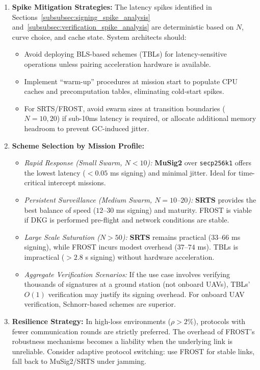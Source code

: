 \begin{enumerate}
    \item \textbf{Spike Mitigation Strategies:} The latency spikes identified in Sections~\ref{subsubsec:signing_spike_analysis} and~\ref{subsubsec:verification_spike_analysis} are deterministic based on $N$, curve choice, and cache state. System architects should:
    \begin{itemize}
        \item Avoid deploying BLS-based schemes (TBLs) for latency-sensitive operations unless pairing acceleration hardware is available.
        \item Implement ``warm-up'' procedures at mission start to populate CPU caches and precomputation tables, eliminating cold-start spikes.
        \item For SRTS/FROST, avoid swarm sizes at transition boundaries ($N=10, 20$) if sub-10ms latency is required, or allocate additional memory headroom to prevent GC-induced jitter.
    \end{itemize}
    
    \item \textbf{Scheme Selection by Mission Profile:}
    \begin{itemize}
        \item \textit{Rapid Response (Small Swarm, $N < 10$):} \textbf{MuSig2} over \texttt{secp256k1} offers the lowest latency ($< 0.05$ ms signing) and minimal jitter. Ideal for time-critical intercept missions.
        \item \textit{Persistent Surveillance (Medium Swarm, $N = 10$--$20$):} \textbf{SRTS} provides the best balance of speed ($12$--$30$ ms signing) and maturity. FROST is viable if DKG is performed pre-flight and network conditions are stable.
        \item \textit{Large Scale Saturation ($N > 50$):} \textbf{SRTS} remains practical ($33$--$66$ ms signing), while FROST incurs modest overhead ($37$--$74$ ms). TBLs is impractical ($> 2.8$ s signing) without hardware acceleration.
        \item \textit{Aggregate Verification Scenarios:} If the use case involves verifying thousands of signatures at a ground station (not onboard UAVs), TBLs' $O(1)$ verification may justify its signing overhead. For onboard UAV verification, Schnorr-based schemes are superior.
    \end{itemize}
    
    \item \textbf{Resilience Strategy:} In high-loss environments ($\rho > 2\%$), protocols with fewer communication rounds are strictly preferred. The overhead of FROST's robustness mechanisms becomes a liability when the underlying link is unreliable. Consider adaptive protocol switching: use FROST for stable links, fall back to MuSig2/SRTS under jamming.
    

\end{enumerate}
